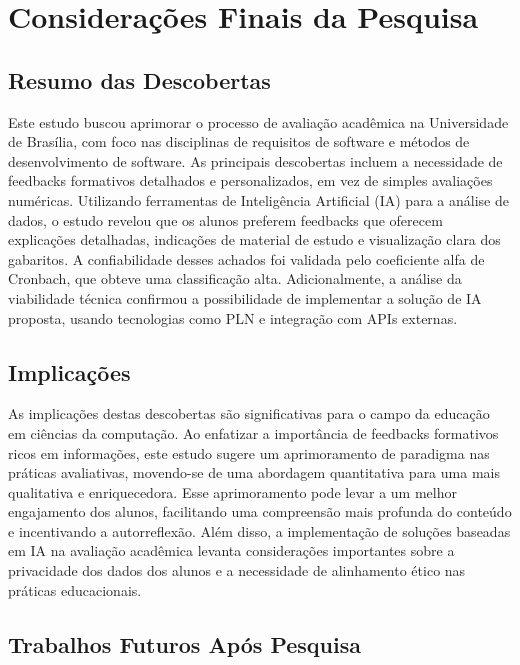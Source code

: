 \chapter{Considerações Finais da Pesquisa}

\section{Resumo das Descobertas}

Este estudo buscou aprimorar o processo de avaliação acadêmica na Universidade de Brasília, com foco nas disciplinas de requisitos de software e métodos de desenvolvimento de software. As principais descobertas incluem a necessidade de feedbacks formativos detalhados e personalizados, em vez de simples avaliações numéricas. Utilizando ferramentas de Inteligência Artificial (IA) para a análise de dados, o estudo revelou que os alunos preferem feedbacks que oferecem explicações detalhadas, indicações de material de estudo e visualização clara dos gabaritos. A confiabilidade desses achados foi validada pelo coeficiente alfa de Cronbach, que obteve uma classificação alta. Adicionalmente, a análise da viabilidade técnica confirmou a possibilidade de implementar a solução de IA proposta, usando tecnologias como PLN e integração com APIs externas.

\section{Implicações}

As implicações destas descobertas são significativas para o campo da educação em ciências da computação. Ao enfatizar a importância de feedbacks formativos ricos em informações, este estudo sugere um aprimoramento de paradigma nas práticas avaliativas, movendo-se de uma abordagem quantitativa para uma mais qualitativa e enriquecedora. Esse aprimoramento pode levar a um melhor engajamento dos alunos, facilitando uma compreensão mais profunda do conteúdo e incentivando a autorreflexão. Além disso, a implementação de soluções baseadas em IA na avaliação acadêmica levanta considerações importantes sobre a privacidade dos dados dos alunos e a necessidade de alinhamento ético nas práticas educacionais.

\section{Trabalhos Futuros Após Pesquisa}

